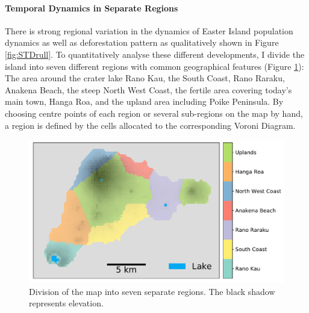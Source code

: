 \paragraph{Temporal Dynamics in Separate Regions}
There is strong regional variation in the dynamics of Easter Island population dynamics as well as deforestation pattern as qualitatively shown in Figure \ref{fig:STDrull}. 
To quantitatively analyse these different developments, I divide the island into seven different regions with common geographical features (Figure \ref{fig:mapregionscoarse}): The area around the crater lake Rano Kau, the South Coast, Rano Raraku, Anakena Beach, the steep North West Coast, the fertile area covering today's main town, Hanga Roa, and the upland area including Poike Peninsula. 
By choosing centre points of each region or several sub-regions on the map by hand, a region is defined by the cells allocated to the corresponding Voroni Diagram.

\begin{figure}
	\centering
	\includegraphics[width=1.0\linewidth]{images/Results/Standard/MapRegionsCoarse}
	\caption{Division of the map into seven separate regions. The black shadow represents elevation.}
	\label{fig:mapregionscoarse}
\end{figure}

